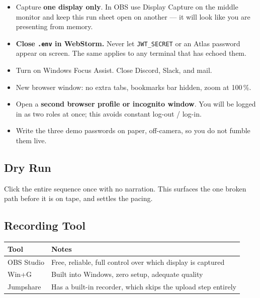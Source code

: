 \documentclass[11pt,letterpaper]{article}
\newenvironment{checklist}
  {\begin{itemize}[label=$\square$,leftmargin=1.6em,itemsep=3pt]}
  {\end{itemize}}
\begin{document}
\begin{checklist}
  \item Capture \textbf{one display only}. In OBS use Display Capture on the
        middle monitor and keep this run sheet open on another --- it will
        look like you are presenting from memory.
  \item \textbf{Close \texttt{.env} in WebStorm.} Never let
        \texttt{JWT\_SECRET} or an Atlas password appear on screen. The same
        applies to any terminal that has echoed them.
  \item Turn on Windows Focus Assist. Close Discord, Slack, and mail.
  \item New browser window: no extra tabs, bookmarks bar hidden, zoom at
        100\,\%.
  \item Open a \textbf{second browser profile or incognito window}. You will
        be logged in as two roles at once; this avoids constant
        log-out / log-in.
  \item Write the three demo passwords on paper, off-camera, so you do not
        fumble them live.
\end{checklist}

\subsection{Dry Run}

Click the entire sequence once with no narration. This surfaces the one
broken path before it is on tape, and settles the pacing.

\subsection{Recording Tool}

\begin{center}
\begin{tabularx}{\textwidth}{@{}L{3.2cm} X@{}}
\toprule
\textbf{Tool} & \textbf{Notes}\\
\midrule
OBS Studio   & Free, reliable, full control over which display is captured\\
Win+G        & Built into Windows, zero setup, adequate quality\\
Jumpshare    & Has a built-in recorder, which skips the upload step entirely\\
\bottomrule
\end{tabularx}
\end{center}

\end{document}
